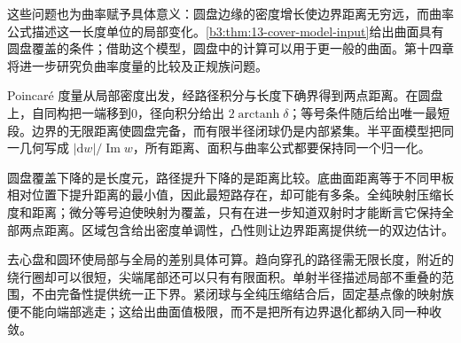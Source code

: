 \ProseParagraphBreak
这些问题也为曲率赋予具体意义：圆盘边缘的密度增长使边界距离无穷远，而曲率公式描述这一长度单位的局部变化。\cref{b3:thm:13-cover-model-input}给出曲面具有圆盘覆盖的条件；借助这个模型，圆盘中的计算可以用于更一般的曲面。第十四章将进一步研究负曲率度量的比较及正规族问题。






\begin{chaptersummary}
Poincaré 度量从局部密度出发，经路径积分与长度下确界得到两点距离。在圆盘上，自同构把一端移到0，径向积分给出 \(2\operatorname{arctanh}\delta\)；等号条件随后给出唯一最短段。边界的无限距离使圆盘完备，而有限半径闭球仍是内部紧集。半平面模型把同一几何写成 \(|\mathrm dw|/\operatorname{Im}w\)，所有距离、面积与曲率公式都要保持同一个归一化。

\ProseParagraphBreak
圆盘覆盖下降的是长度元，路径提升下降的是距离比较。底曲面距离等于不同甲板相对位置下提升距离的最小值，因此最短路存在，却可能有多条。全纯映射压缩长度和距离；微分等号迫使映射为覆盖，只有在进一步知道双射时才能断言它保持全部两点距离。区域包含给出密度单调性，凸性则让边界距离提供统一的双边估计。

\ProseParagraphBreak
去心盘和圆环使局部与全局的差别具体可算。趋向穿孔的路径需无限长度，附近的绕行圈却可以很短，尖端尾部还可以只有有限面积。单射半径描述局部不重叠的范围，不由完备性提供统一正下界。紧闭球与全纯压缩结合后，固定基点像的映射族便不能向端部逃走；这给出曲面值极限，而不是把所有边界退化都纳入同一种收敛。
\end{chaptersummary}

\BookExercises

